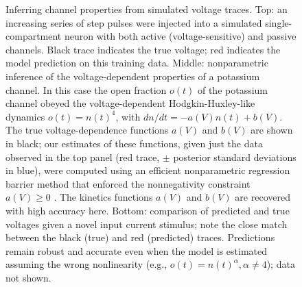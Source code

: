 \documentclass[12pt]{article}
\begin{document}
\begin{figure}[t!]
\begin{center}
\epsfxsize=5in
\caption{\small Inferring channel properties from simulated voltage
  traces.  Top: an increasing series of step pulses were injected into
  a simulated single-compartment neuron with both active
  (voltage-sensitive) and passive channels.  Black trace indicates the
  true voltage; red indicates the model prediction on this training
  data.  Middle: nonparametric inference of the voltage-dependent
  properties of a potassium channel.  In this case the open fraction
  $o(t)$ of the potassium channel obeyed the voltage-dependent
  Hodgkin-Huxley-like dynamics $o(t)=n(t)^4$, with $dn/dt = -a(V)n(t)
  + b(V)$.  The true voltage-dependence functions $a(V)$ and $b(V)$
  are shown in black; our estimates of these functions, given just the
  data observed in the top panel (red trace, $\pm$ posterior standard
  deviations in blue), were computed using an efficient nonparametric
  regression barrier method that enforced the nonnegativity constraint
  $a(V) \geq 0$ \cite{PanBook}.  The kinetics functions $a(V)$ and
  $b(V)$ are recovered with high accuracy here.  Bottom: comparison of
  predicted and true voltages given a novel input current stimulus;
  note the close match between the black (true) and red (predicted)
  traces.  Predictions remain robust and accurate even when the model
  is estimated assuming the wrong nonlinearity (e.g.,
  $o(t)=n(t)^\alpha, \alpha \neq 4$); data not shown.}
\label{fig:q-channels}
\end{center}
\end{figure}
\end{document}
